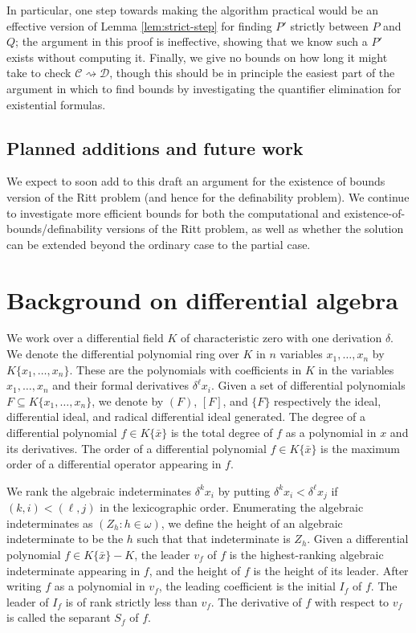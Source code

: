 \documentclass[12pt]{amsart}
\theoremstyle{definition}
\numberwithin{subcase}{cases}
\theoremstyle{remark}
\newcommand{\mc}[1]{\mathcal{#1}}
\begin{document}
In particular, one step towards making the algorithm practical would be an effective version of Lemma \ref{lem:strict-step} for finding $P'$ strictly between $P$ and $Q$; the argument in this proof is ineffective, showing that we know such a $P'$ exists without computing it. Finally, we give no bounds on how long it might take to check $\mc{C} \rightsquigarrow \mc{D}$, though this should be in principle the easiest part of the argument in which to find bounds by investigating the quantifier elimination for existential formulas.

\subsection{Planned additions and future work}

We expect to soon add to this draft an argument for the existence of bounds version of the Ritt problem (and hence for the definability problem). We continue to investigate more efficient bounds for both the computational and existence-of-bounds/definability versions of the Ritt problem, as well as whether the solution can be extended beyond the ordinary case to the partial case.

\section{Background on differential algebra} \label{charsetssection}

We work over a differential field $K$ of characteristic zero with one derivation $\delta$. We denote the differential polynomial ring over $K$ in $n$ variables $x_1,\ldots,x_n$ by $K\{x_1,\ldots,x_n\}$. These are the polynomials with coefficients in $K$ in the variables $x_1,\ldots,x_n$ and their formal derivatives $\delta^\ell x_i$. Given a set of differential polynomials $F \subseteq K\{x_1,\ldots,x_n\}$, we denote by $(F)$, $[F]$, and $\{F\}$ respectively the ideal, differential ideal, and radical differential ideal generated. The degree of a differential polynomial $f \in K\{\bar{x}\}$ is the total degree of $f$ as a polynomial in $x$ and its derivatives. The order of a differential polynomial $f \in K\{\bar{x}\}$ is the maximum order of a differential operator appearing in $f$.

We rank the algebraic indeterminates $\delta^k x_i$ by putting $\delta^k x_i < \delta^\ell x_j$ if $(k,i) < (\ell,j)$ in the lexicographic order. Enumerating the algebraic indeterminates as $(Z_h : h \in \omega)$, we define the height of an algebraic indeterminate to be the $h$ such that that indeterminate is $Z_h$. Given a differential polynomial $f \in K\{\bar{x}\} - K$, the leader $v_f$ of $f$ is the highest-ranking algebraic indeterminate appearing in $f$, and the height of $f$ is the height of its leader. After writing $f$ as a polynomial in $v_f$, the leading coefficient is the initial $I_f$ of $f$. The leader of $I_f$ is of rank strictly less than $v_f$. The derivative of $f$ with respect to $v_f$ is called the separant $S_f$ of $f$.
\end{document}
